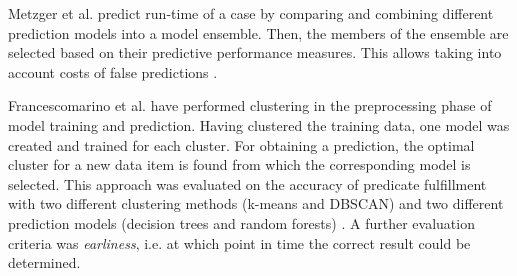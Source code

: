 Metzger et al. predict run-time of a case by comparing and combining different prediction models into a model ensemble.
Then, the members of the ensemble are selected based on their predictive performance measures.
This allows taking into account costs of false predictions \cite{metzger2015}.

Francescomarino et al. have performed clustering in the preprocessing phase of model training and prediction.
Having clustered the training data, one model was created and trained for each cluster.
For obtaining a prediction, the optimal cluster for a new data item is found from which the corresponding model is selected.
This approach was evaluated on the accuracy of predicate fulfillment with two different clustering methods (k-means and DBSCAN) and two different prediction models (decision trees and random forests) \cite{francescomarino2015}.
A further evaluation criteria was \textit{earliness}, i.e. at which point in time the correct result could be determined.
